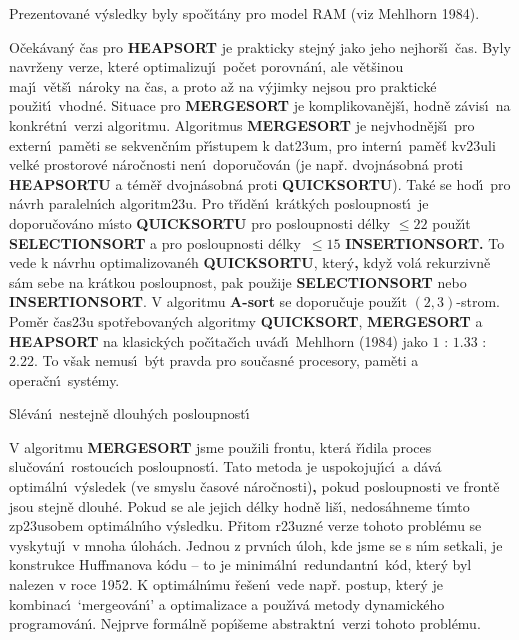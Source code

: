 \flushpar Prezentovan\'e  v\'ysledky byly spo\v c\'\i t\'any 
pro model RAM (viz Mehlhorn 1984).
\medskip

\flushpar O\v cek\'avan\'y \v cas pro {\bf HEAPSORT} je prakticky stejn\'y jako 
jeho nej\-hor\v s\'\i\ \v cas.  Byly navr\v zeny verze, kter\'e optimalizuj\'\i\ 
po\v cet porov\-n\'an\'\i , ale v\v et\v sinou maj\'\i\ v\v et\v s\'\i\ n\'aroky na 
\v cas, a proto a\v z na v\'yjimky ne\-jsou pro praktick\'e 
pou\v zit\'\i\ vhodn\'e.  
Situace pro {\bf MERGESORT} je komplikovan\v ej\v s\'\i , hod\-n\v e z\'avis\'\i\ 
na konkr\'etn\'\i\ verzi algoritmu.  Algoritmus 
{\bf MER\-GE\-SORT} je nejvhodn\v ej\v s\'\i\ pro extern\'\i\ pam\v eti se  
sekven\v cn\'\i m p\v r\'\i stupem k dat\accent23um, pro intern\'\i\ 
pam\v e\v t kv\accent23uli velk\'e prostorov\'e n\'aro\v cnosti 
nen\'\i\ doporu\v cov\'an (je nap\v r. dvojn\'asobn\'a proti {\bf HEAPSORTU }
a t\'em\v e\v r dvojn\'asobn\'a proti {\bf QUICKSORTU}). Tak\'e se hod\'\i\ pro 
n\'avrh pa\-ra\-leln\'\i ch algoritm\accent23u. Pro t\v r\'\i d\v en\'\i\ 
kr\'atk\'ych posloupnost\'\i\ je doporu\v cov\'ano m\'\i sto {\bf QUICKSORTU }
pro posloupnosti d\'elky $\le 22$ pou\v z\'\i t {\bf SELECTIONSORT} a pro 
posloupnosti d\'elky $\,\le 15$  {\bf INSERTIONSORT.}
To vede k n\'avrhu optimalizovan\'eh {\bf QUICKSORTU}, 
kter\'y{\bf ,}  kdy\v z 
vol\'a rekurzivn\v e s\'am sebe na kr\'atkou posloupnost, pak 
pou\v zije {\bf SELECTIONSORT} ne\-bo {\bf INSERTIONSORT}. V algoritmu {\bf A-sort }
se doporu\-\v cu\-je pou\v z\'\i t $(2,3)$-strom.  
Pom\v er \v cas\accent23u spot\v rebovan\'ych  
algoritmy {\bf QUICKSORT},  {\bf MERGESORT} a {\bf HEAPSORT} na 
klasick\'ych po\v c\'\i ta\v c\'\i ch uv\'ad\'\i\ Mehlhorn (1984) jako  
$1$ : $1.33$ : $2.22$. To 
v\v sak nemus\'\i\  b\'yt pravda pro sou\v casn\'e procesory, 
pam\v eti a opera\v cn\'\i\ syst\'emy. 
\bigskip

\head
Sl\'ev\'an\'\i\ nestejn\v e dlouh\'ych posloupnost\'\i
\endhead

\flushpar V algoritmu {\bf MERGESORT} jsme pou\v zili frontu, kter\'a 
\v r\'\i dila proces slu\v cov\'an\'\i\ rostouc\'\i ch posloupnost\'\i .  Tato metoda je uspokojuj\'\i c\'\i\ a 
d\'av\'a optim\'aln\'\i\ v\'ysledek (ve smyslu \v casov\'e n\'aro\v cnosti){\bf ,} pokud posloupnosti ve front\v e jsou 
stejn\v e dlouh\'e.  Pokud se ale jejich d\'elky hodn\v e li\v s\'\i , 
nedos\'ahneme t\'\i mto zp\accent23usobem  
optim\'aln\'\i ho v\'ysledku.  P\v ritom r\accent23uzn\'e verze tohoto 
probl\'emu se vyskytuj\'\i\ v mnoha \'uloh\'ach. Jednou z prvn\'\i ch \'uloh, 
kde jsme se s n\'\i m setkali, je konstrukce 
Huffmanova k\'odu -- to je minim\'aln\'\i\ redundantn\'\i\ k\'od, kter\'y byl 
nalezen v roce 1952. K optim\'aln\'\i mu \v re\v sen\'\i\ vede nap\v r. 
postup, kter\'y je kombinac\'\i\ `mergeov\'an\'\i ' a 
optimalizace a pou\v z\'\i v\'a metody dynamick\'eho programov\'an\'\i .  
Nejprve form\'aln\v e pop\'\i\v seme abstraktn\'\i\ verzi tohoto probl\'emu.  
\medskip

